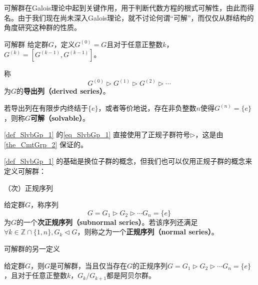 



可解群在Galois理论中起到关键作用，用于判断代数方程的根式可解性，由此而得名。由于我们现在尚未深入Galois理论，就不讨论何谓“可解”，而仅仅从群结构的角度研究这种群的性质。


\begin{definition}{可解群}\label{def_SlvbGp_1}
给定群$G$，定义$G^{(0)}=G$且对于任意正整数$k$，$G^{(k)}=[G^{(k-1)}, G^{(k-1)}]$。

称
\begin{equation}\label{eq_SlvbGp_1}
G^{(0)}\rhd G^{(1)}\rhd G^{(2)}\rhd \cdots~
\end{equation}
为$G$的\textbf{导出列（derived series）}。

若导出列在有限步内终结于$\{e\}$，或者等价地说，存在非负整数$n$使得$G^{(n)}=\{e\}$，则称$G$\textbf{可解（solvable）}。

\end{definition}


\autoref{def_SlvbGp_1} 的\autoref{eq_SlvbGp_1} 直接使用了正规子群符号$\rhd$，这是由\autoref{the_CmtGrp_2} 保证的。



\autoref{def_SlvbGp_1} 的基础是换位子群的概念，但我们也可以仅用正规子群的概念来定义可解群：



\begin{definition}{（次）正规序列}

给定群$G$，称序列
\begin{equation}
G=G_1\rhd G_2\rhd\cdots G_n=\{e\}~
\end{equation}
为$G$的一个\textbf{次正规序列（subnormal series）}。若该序列还满足$\forall k\in \mathbb{Z}\cap\{1, n\}, G_k\lhd G$，则称之为一个\textbf{正规序列（normal series）}。

\end{definition}



\begin{theorem}{可解群的另一定义}

给定群$G$，则$G$是可解群，当且仅当存在$G$的正规序列$G=G_1\rhd G_2\rhd\cdots G_n=\{e\}$，且对于任意正整数$k$，$G_k/G_{k+1}$都是阿贝尔群。

\end{theorem}



